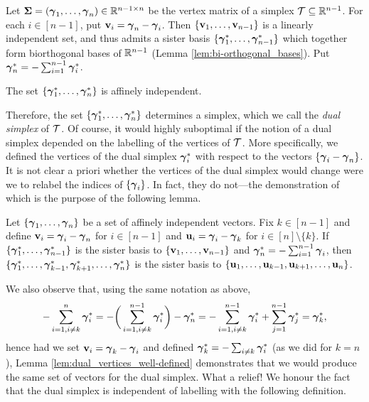 Let $\boldsymbol{\Sigma}=(\vb*{\gamma}_1,\dots,\vb*{\gamma}_n)\in\mathbb{R}^{n-1\times n}$ be the vertex matrix of a simplex $\mathcal{T}\subseteq\mathbb{R}^{n-1}$. For each $i\in[n-1]$, put $\vb{v}_i=\vb*{\gamma}_n-\vb*{\gamma}_i$. Then $\{\vb{v}_1,\dots,\vb{v}_{n-1}\}$ is a linearly independent set, and thus admits a sister basis $\{\vb*{\gamma}^*_1,\dots,\vb*{\gamma}^*_{n-1}\}$ which together form biorthogonal bases of $\mathbb{R}^{n-1}$ (Lemma \ref{lem:bi-orthogonal_bases}). Put $\vb*{\gamma}^*_n = -\sum_{i=1}^{n-1}\vb*{\gamma}^*_i$.  

\begin{claim}
	\label{claim:affine_independence}
The set 
$\{\vb*{\gamma}^*_1,\dots,\vb*{\gamma}^*_n\}$ is affinely independent. 
\end{claim}

Therefore, the set $\{\vb*{\gamma}^*_1,\dots,\vb*{\gamma}^*_n\}$ determines a simplex, which we call the \emph{dual simplex} of $\mathcal{T}$. Of course, it would highly suboptimal if the notion of a dual simplex depended on the labelling of the vertices of $\mathcal{T}$. More specifically, we defined the vertices of the dual simplex $\vb*{\gamma}^*_i$ with respect to the vectors $\{\vb*{\gamma}_i-\vb*{\gamma}_n\}$. It is not clear a priori whether the vertices of the dual simplex would change were we to relabel the indices of $\{\vb*{\gamma}_i\}$. In fact, they do not---the demonstration of which is the purpose of the following lemma. 

\begin{lemma}
	\label{lem:dual_vertices_well-defined}
	Let $\{\vb*{\gamma}_1,\dots,\vb*{\gamma}_n\}$ be a set of affinely independent vectors. Fix $k\in [n-1]$ and define $\vb{v}_i=\vb*{\gamma}_i-\vb*{\gamma}_n$ for $i\in[n-1]$ and $\vb{u}_i=\vb*{\gamma}_i-\vb*{\gamma}_k$ for $i\in[n]\setminus\{k\}$. If $\{\vb*{\gamma}^*_1,\dots,\vb*{\gamma}^*_{n-1}\}$ is the sister basis to $\{\vb{v}_1,\dots,\vb{v}_{n-1}\}$ and $\vb*{\gamma}^*_n = -\sum_{i=1}^{n-1}\vb*{\gamma}_i$, then $\{\vb*{\gamma}^*_1,\dots,\vb*{\gamma}^*_{k-1},\vb*{\gamma}^*_{k+1},\dots,\vb*{\gamma}^*_{n}\}$ is the sister basis to $\{\vb{u}_1,\dots,\vb{u}_{k-1},\vb{u}_{k+1},\dots,\vb{u}_n\}$. 
\end{lemma}


We also observe that, using the same notation as above, 
\[-\sum_{i=1,i\neq k}^n \vb*{\gamma}^
*_i = -\bigg(\sum_{i=1,i\neq k}^{n-1} \vb*{\gamma}^*_i\bigg) - \vb*{\gamma}^*_n = -\sum_{i=1,i\neq k}^{n-1}\vb*{\gamma}^*_i + \sum_{j=1}^{n-1} \vb*{\gamma}^*_j = \vb*{\gamma}^*_k,\]
hence had we set $\vb{v}_i=\vb*{\gamma}_k-\vb*{\gamma}_i$ and defined $\vb*{\gamma}^*_k = -\sum_{i\neq k}\vb*{\gamma}^*_i$ (as we did for $k=n$), Lemma \ref{lem:dual_vertices_well-defined} demonstrates that we would produce the same set of vectors for the dual simplex. What a relief! We honour the fact that the dual simplex is independent of labelling with the following definition. 


